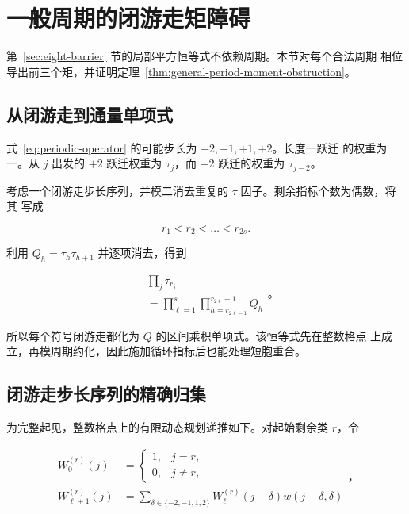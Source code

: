 \section{一般周期的闭游走矩障碍}\label{sec:general-period}

第~\ref{sec:eight-barrier} 节的局部平方恒等式不依赖周期。本节对每个合法周期
相位导出前三个矩，并证明定理~\ref{thm:general-period-moment-obstruction}。

\subsection{从闭游走到通量单项式}

式~\eqref{eq:periodic-operator} 的可能步长为 \(-2,-1,+1,+2\)。长度一跃迁
的权重为一。从 \(j\) 出发的 \(+2\) 跃迁权重为 \(\tau_j\)，而 \(-2\)
跃迁的权重为 \(\tau_{j-2}\)。

考虑一个闭游走步长序列，并模二消去重复的 \(\tau\) 因子。剩余指标个数为偶数，将其
写成

\begin{equation}
r_{1}<r_{2}<\ldots<r_{2s}.
\end{equation}

利用 \(Q_h=\tau_h\tau_{h+1}\) 并逐项消去，得到

\begin{equation}
\label{eq:tau-product-from-flux}
\begin{aligned}
&\prod_j \tau_{r_j} \\
&=\prod_{\ell=1}^{s}\prod_{h=r_{2\ell-1}}^{r_{2\ell}-1}Q_h
\end{aligned}
\text{。}
\end{equation}

所以每个符号闭游走都化为 \(Q\) 的区间乘积单项式。该恒等式先在整数格点
上成立，再模周期约化，因此施加循环指标后也能处理短胞重合。

\subsection{闭游走步长序列的精确归集}

为完整起见，整数格点上的有限动态规划递推如下。对起始剩余类 \(r\)，令

\begin{equation}
\label{eq:walk-recurrence}
\begin{aligned}W_0^{(r)}(j)&=\begin{cases}1,&j=r,\\0,&j\ne r,\end{cases}\\
W_{\ell+1}^{(r)}(j)&=\sum_{\delta\in\{-2,-1,1,2\}}W_{\ell}^{(r)}(j-\delta)w(j-\delta,\delta)
\end{aligned}
\text{，}
\end{equation}

